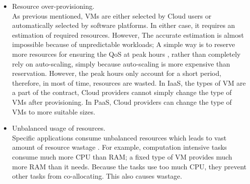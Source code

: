 \begin{itemize}
	\item Resource over-provisioning. \\
	As previous mentioned, VMs are either selected by Cloud users or automatically selected by software platforms. In either case, it requires an estimation of required resources. However, The accurate estimation is almost impossible because of unpredictable workloads; A simple way is to reserve more resources for ensuring the QoS at peak hours \cite{Chaisiri:2012cv}, rather than completely rely on auto-scaling, simply because auto-scaling is more expensive than reservation. However, the peak hours only account for a short period, therefore, in most of time, resources are wasted. In IaaS, the types of VM are a part of the contract, Cloud providers cannot simply change the type of VMs after provisioning. In PaaS, Cloud providers can change the type of VMs to more suitable sizes.

	\item Unbalanced usage of resources. \\
	Specific applications consume unbalanced resources which leads to vast amount of resource wastage \cite{Tomas:2013iv}. For example, computation intensive tasks consume much more CPU than RAM; a fixed type of VM provides much more RAM than it needs. Because the tasks use too much CPU, they prevent other tasks from co-allocating. This also causes wastage.


\end{itemize}
